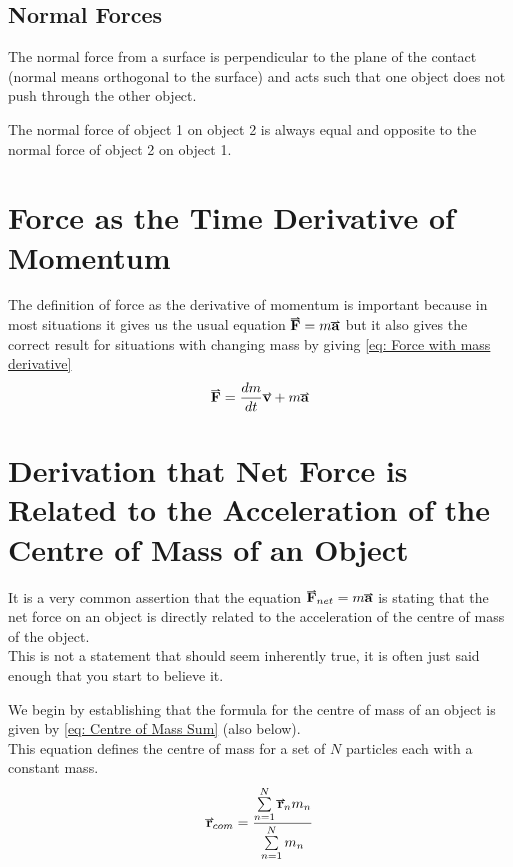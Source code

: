 \documentclass[main.tex]{subfiles}
\begin{document}
                \subsection{Normal Forces}
                    \label{subsec: Normal Forces}

                    The normal force from a surface is perpendicular to the plane of the contact (normal means orthogonal to the surface) and acts such that one object does not push through the other object.

                    The normal force of object 1 on object 2 is always equal and opposite to the normal force of object 2 on object 1.



            \newpage
            \section{Force as the Time Derivative of Momentum}
                \label{sec: Force as the derivative of Momentum}

                The definition of force as the derivative of momentum is important because in most situations it gives us the usual equation $\vect{F} = m\vect{a}$ but it also gives the correct result for situations with changing mass by giving \eqref{eq: Force with mass derivative}
                \begin{equation}
                    \vect{F} = \frac{dm}{dt}\vect{v} + m\vect{a}
                    \label{eq: Force with mass derivative}
                \end{equation}

            \section{Derivation that Net Force is Related to the Acceleration of the Centre of Mass of an Object}
                \label{sec: Centre of Mass Force Relationship}

                It is a very common assertion that the equation $\vect{F}_{net} = m\vect{a}$ is stating that the net force on an object is directly related to the acceleration of the centre of mass of the object.\\
                This is not a statement that should seem inherently true, it is often just said enough that you start to believe it.
                
                We begin by establishing that the formula for the centre of mass of an object is given by \eqref{eq: Centre of Mass Sum} (also below).\\
                This equation defines the centre of mass for a set of $N$ particles each with a constant mass.
                \begin{equation*}
                    \vect{r}_{com} = \frac{\sum\limits_{n=1}^N \vect{r}_n m_n}{\sum\limits_{n=1}^N m_n}
                \end{equation*}
\end{document}
